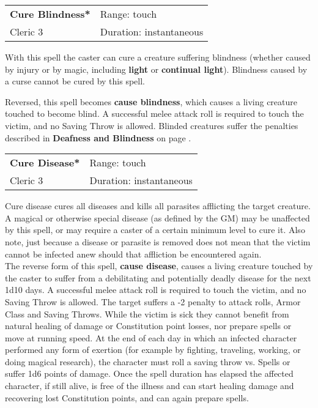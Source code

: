 \documentclass[a4paper,twoside,openany,10pt]{book}
\begin{document}
\begin{multicols}{2}
\smallskip\begin{flushleft} 
	\begin{tabularx}{0.45\textwidth}{@{}m{3.5cm}m{5.5cm}@{}} 
		\textbf{Cure Blindness*} & Range: touch\\
		Cleric 3 &Duration: instantaneous\\
	\end{tabularx}\end{flushleft}

With this spell the caster can cure a creature suffering blindness (whether caused by injury or by magic, including \textbf{light} or \textbf{continual light}). Blindness caused by a curse cannot be cured by this spell.

Reversed, this spell becomes \textbf{cause blindness}, which causes a living creature touched to become blind. A successful melee attack roll is required to touch the victim, and no Saving Throw is allowed. Blinded creatures suffer the penalties described in \textbf{Deafness and Blindness} on page \hyperlink{deafness-and-blindness}{\pageref{deafness-and-blindness}}.

\smallskip\begin{flushleft} 
	\begin{tabularx}{0.45\textwidth}{@{}m{3.5cm}m{5.5cm}@{}} 
		\textbf{Cure Disease*} & Range: touch\\
		Cleric 3 &Duration: instantaneous\\
	\end{tabularx}\end{flushleft}

Cure disease cures all diseases and kills all parasites afflicting the target creature. A magical or otherwise special disease (as defined by the GM) may be unaffected by this spell, or may require a caster of a certain minimum level to cure it. Also note, just because a disease or parasite is removed does not mean that the victim cannot be infected anew should that affliction be encountered again.\\

The reverse form of this spell, \textbf{cause disease}, causes a living creature touched by the caster to suffer from a debilitating and potentially deadly disease for the next 1d10 days. A successful melee attack roll is required to touch the victim, and no Saving Throw is allowed. The target suffers a -2 penalty to attack rolls, Armor Class and Saving Throws. While the victim is sick they cannot benefit from natural healing of damage or Constitution point losses, nor prepare spells or move at running speed. At the end of each day in which an infected character performed any form of exertion (for example by fighting, traveling, working, or doing magical research), the character must roll a saving throw vs. Spells or suffer 1d6 points of damage. Once the spell duration has elapsed the affected character, if still alive, is free of the illness and can start healing damage and recovering lost Constitution points, and can again prepare spells.



\end{multicols}
\end{document}
